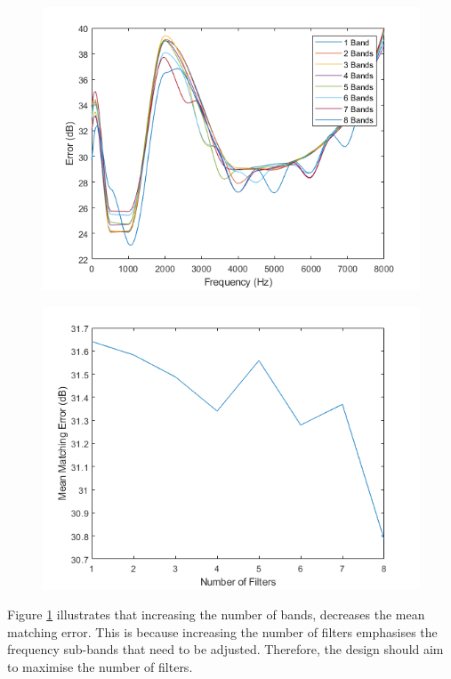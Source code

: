 \documentclass[12pt, onecolumn]{article}
\begin{document}
\begin{figure}
\centering
\begin{minipage}{.45\linewidth}
  \centering
  \includegraphics[width=0.9\linewidth]{numBandsErrorFreq.png}
  \label{fig:numBandsErrorFreq}
\end{minipage}%
\begin{minipage}{.45\linewidth}
  \centering
  \includegraphics[width=0.9\linewidth]{numBandErrorBand.png}
  \label{fig:numBandsErrorBand}
\end{minipage}
\end{figure}

\noindent Figure \ref{fig:numBandsErrorBand} illustrates that increasing the number of bands, decreases the mean matching error. This is because increasing the number of filters emphasises the frequency sub-bands that need to be adjusted. Therefore, the design should aim to maximise the number of filters.
\end{document}
